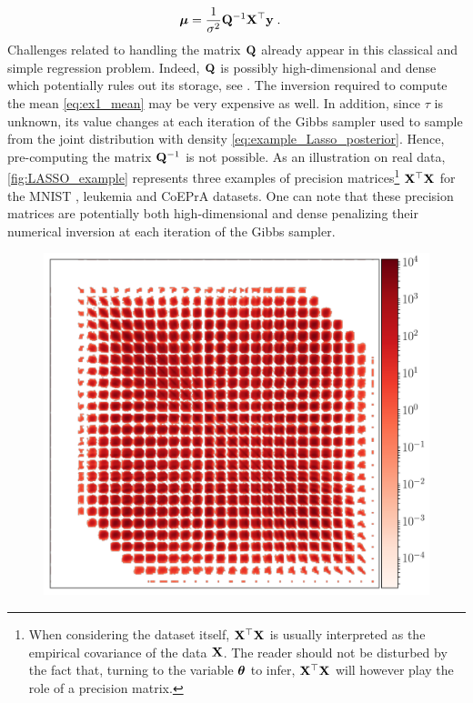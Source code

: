 \documentclass[nohypdvips,onefignum,onetabnum]{siamart171218}
\begin{document}
\begin{example}
\begin{align}
    &\Bs{\mu} = \frac{1}{\sigma^{2}} \B{Q}^{-1}\B{X}^{\top}\B{y}\eqsp. \label{eq:ex1_mean}
  \end{align} 
  Challenges related to handling the matrix $\mathbf{Q}$ already appear in this classical and simple regression problem.
  Indeed, $\mathbf{Q}$ is possibly high-dimensional and dense which potentially rules out its storage, see . 
  The inversion required to compute the mean \cref{eq:ex1_mean} may be very expensive as well. 
  In addition, since $\tau$ is unknown, its value changes at each iteration of the Gibbs sampler used to sample from the joint distribution with density \cref{eq:example_Lasso_posterior}.
  Hence, pre-computing the matrix $\mathbf{Q}^{-1}$ is not possible.
  As an illustration on real data, \cref{fig:LASSO_example} represents three examples of precision matrices\footnote{When considering the dataset itself, $\mathbf{X}^{\top}\mathbf{X}$ is usually interpreted as the empirical covariance of the data $\mathbf{X}$. The reader should not be disturbed by the fact that, turning to the variable $\boldsymbol{\theta}$ to infer, $\mathbf{X}^{\top}\mathbf{X}$ will however play the role of a precision matrix.} $\mathbf{X}^{\top}\mathbf{X}$ for the MNIST \cite{LeCun1998}, leukemia \cite{Armstrong2002} and CoEPrA \cite{CoEPrA} datasets.
  One can note that these precision matrices are potentially both high-dimensional and dense penalizing their numerical inversion at each iteration of the Gibbs sampler.
  \begin{figure}
  \centering
  \mbox{{\includegraphics[scale=0.18]{images/MNIST_AA.pdf}}}

\end{figure}
\end{example}
\end{document}
